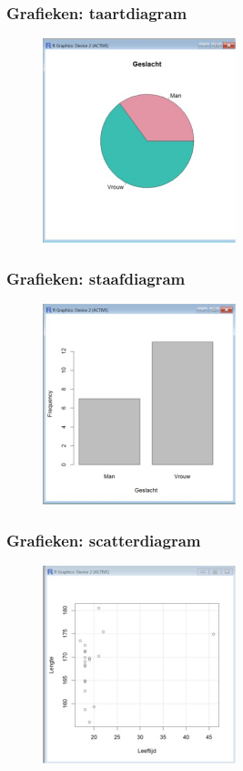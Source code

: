 \documentclass{beamer}
\begin{document}
\begin{frame}
  \frametitle{Grafieken: taartdiagram}
  \begin{figure}
    \includegraphics[width=0.5\textwidth]{img/oef3/taartdiagram-geslacht}
  \end{figure}
\end{frame}

\begin{frame}
  \frametitle{Grafieken: staafdiagram}
  \begin{figure}
    \includegraphics[width=0.5\textwidth]{img/oef3/staafdiagram-geslacht}
  \end{figure}
\end{frame}

\begin{frame}
  \frametitle{Grafieken: scatterdiagram}
  \begin{figure}
    \includegraphics[width=0.5\textwidth]{img/oef3/scatterdiagram}
  \end{figure}
\end{frame}
\end{document}
